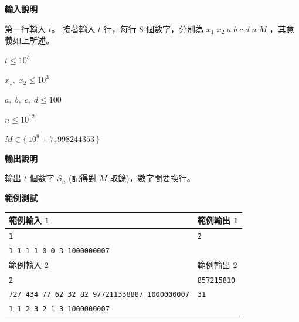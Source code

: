     \textbf{輸入說明}

    第一行輸入 $t$。
    接著輸入 $t$ 行，每行 $8$ 個數字，分別為 $x_1 \; x_2 \; a \; b \; c \; d \; n \; M$ ，其意義如上所述。

    $t \le 10^3$

    $x_1, \; x_2 \le 10^3$

    $a, \; b, \; c, \; d \le 100$

    $n \le 10^{12}$
    
    $M \in \{\, 10^9+7,998244353 \,\}$

    \textbf{輸出說明}

    輸出 $t$ 個數字 $S_n$ (記得對 $M$ 取餘)，數字間要換行。

    \textbf{範例測試}

    \begin{tabular}{|m{9.5cm}|m{4.5cm}|}
        \hline
        範例輸入 1 & 範例輸出 1 \\
        \hline
        \verb|1| &  \verb|2| \\
        \verb|1 1 1 1 0 0 3 1000000007| & \\
        \hline
        範例輸入 2 & 範例輸出 2 \\
        \hline
        \verb|2| &  \verb|857215810| \\
        \verb|727 434 77 62 32 82 977211338887 1000000007| & \verb|31| \\
        \verb|1 1 2 3 2 1 3 1000000007| & \\
        \hline
    \end{tabular}